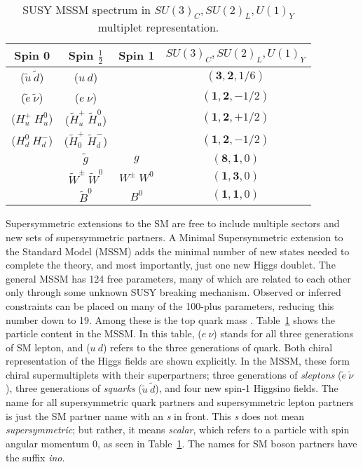 \begin{table}[!htp]
\centering
\small
\begin{tabular}{|c|c|c|c|}
\hline
Spin 0  & Spin $\frac{1}{2}$& Spin 1 &  $SU(3)_{C}, SU(2)_{L}, U(1)_{Y}$ \\
\hline \hline
($\tilde{u}~\tilde{d}$) & ($u~d$)&   & $(\mathbf{3}, \mathbf{2}, 1/6)$ \\ 
\hline
($\tilde{e}~\tilde{\nu}$) & ($e~\nu$)&   & $(\mathbf{1}, \mathbf{2}, -1/2)$ \\
\hline
($H_u^+~H_u^0$)&($\tilde{H}_u^+~\tilde{H}_u^0$) && $(\mathbf{1}, \mathbf{2}, +1/2)$\\
($H_d^0~H_d^-$)&($\tilde{H}_0^+~\tilde{H}_d^-$) & &$(\mathbf{1}, \mathbf{2}, -1/2)$\\
\hline
 &$\tilde{g}$&  $g$ & $(\mathbf{8}, \mathbf{1}, 0)$ \\
\hline
& $\tilde{W}^\pm~ \tilde{W}^0$& $W^\pm~ W^0$ & $(\mathbf{1}, \mathbf{3}, 0)$  \\  
 & $\tilde{B}^0$& $B^0$ & $(\mathbf{1}, \mathbf{1}, 0)$\\ 
\hline

\hline %
\end{tabular}
\caption{SUSY MSSM spectrum in $SU(3)_{C}, SU(2)_{L}, U(1)_{Y}$ multiplet representation.}
\label{tab:susy}
\end{table}
Supersymmetric extensions to the SM are free to include multiple sectors and new sets of supersymmetric partners.  A Minimal Supersymmetric extension to the Standard Model (MSSM) adds the minimal number of new states needed to complete the theory, and most importantly, just one new Higgs doublet.  The general MSSM has 124 free parameters, many of which are related to each other only through some unknown SUSY breaking mechanism.  Observed or inferred constraints can be placed on many of the 100-plus parameters, reducing this number down to 19.  Among these is the top quark mass \cite{Bechtle2006}.  Table~\ref{tab:susy} shows the particle content in the MSSM.  In this table,  ($e~\nu$) stands for all three generations of SM lepton, and ($u~d$) refers to the three generations of quark.  Both chiral representation of the Higgs fields are shown explicitly.  In the MSSM, these form chiral supermultiplets with their superpartners; three generations of \textit{sleptons} ($\tilde{e}~\tilde{\nu}$), three generations of \textit{squarks} ($\tilde{u}~\tilde{d}$), and four new spin-1 Higgsino fields.  The name for all supersymmetric quark partners and supersymmetric lepton partners is just the SM partner name with an \textit{s} in front.  This \textit{s} does not mean \textit{supersymmetric}; but rather, it means \textit{scalar}, which refers to a particle with spin angular momentum 0, as seen in Table~\ref{tab:susy}.  The names for SM boson partners have the suffix \textit{ino}.

